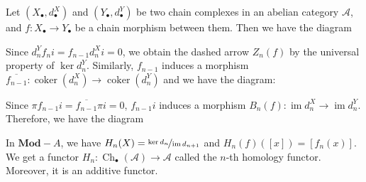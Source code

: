\documentclass{article}
\newcommand{\Acat}{\mathcal{A}}
\newcommand{\Mod}{\mathbf{Mod}}
\DeclareMathOperator{\Ch}{Ch}
\DeclareMathOperator{\coker}{coker}
\DeclareMathOperator{\im}{im}
\theoremstyle{plain}
\theoremstyle{definition}
\theoremstyle{remark}
\begin{document}
Let $(X_\bullet,d_\bullet^X)$ and $(Y_\bullet,d_\bullet^Y)$ be two chain complexes in an abelian category $\Acat$, and $f : X_\bullet \to Y_\bullet$ be a chain morphism between them. Then we have the diagram
\begin{center}
\end{center}
Since $d_n^Y f_n i = f_{n-1} d_n^X i = 0$, we obtain the dashed arrow $Z_n(f)$ by the universal property of $\ker d_n^Y$. Similarly, $f_{n-1}$ induces a morphism $\overline{f_{n-1}} : \coker(d_n^X) \to \coker(d_n^Y)$ and we have the diagram:
\begin{center}
\end{center}
Since $\pi f_{n-1} i = \overline{f_{n-1}} \pi i = 0$, $f_{n-1} i$ induces a morphism $B_n(f) : \im d_n^X \to \im d_n^Y$. Therefore, we have the diagram
\begin{center}
\end{center}
In $\Mod-A$, we have $H_n(X) = \nicefrac{\ker d_n}{\im d_{n+1}}$ and $H_n(f) ([x]) = [f_n(x)]$. We get a functor $H_n : \Ch_\bullet (\Acat) \to \Acat$ called the $n$-th homology functor. Moreover, it is an additive functor.
\end{document}
